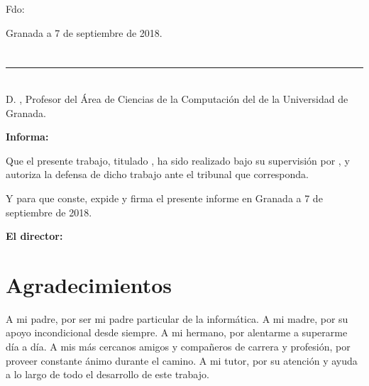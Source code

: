 \noindent Fdo: \myName

\vspace{2cm}

\begin{flushright}
Granada a 7 de septiembre de 2018.
\end{flushright}


\chapter*{}
\thispagestyle{empty}

\noindent\rule[-1ex]{\textwidth}{2pt}\\[4.5ex]

D. \textbf{\myProf}, Profesor del Área de Ciencias de la Computación del  \myDepartment de la Universidad de Granada.

\vspace{0.5cm}

\textbf{Informa:}

\vspace{0.5cm}

Que el presente trabajo, titulado \textit{\textbf{\myTitle}},
ha sido realizado bajo su supervisión por \textbf{\myName}, y autoriza la defensa de dicho trabajo ante el tribunal que corresponda.

\vspace{0.5cm}

Y para que conste, expide y firma el presente informe en Granada a 7 de septiembre de 2018.

\vspace{1cm}

\textbf{El director:}

\vspace{5cm}

\noindent \textbf{\myProf}

\chapter*{Agradecimientos}
\thispagestyle{empty}

       \vspace{1cm}


A mi padre, por ser mi padre particular de la informática. A mi madre, por su apoyo incondicional desde siempre. A mi hermano, por alentarme a superarme día a día. A mis más cercanos amigos y compañeros de carrera y profesión, por proveer constante ánimo durante el camino. A mi tutor, por su atención y ayuda a lo largo de todo el desarrollo de este trabajo.


